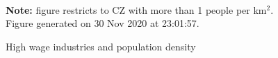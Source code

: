 \begin{figure}[!h]
\centering
\caption{High wage industries and population density}
\label{fig:ind_cities}
  \\ 
\par \begin{minipage}[h]{\textwidth}{\tiny\textbf{Note:} figure restricts to CZ with more than 1 people per km$^2$. Figure generated on 30 Nov 2020 at 23:01:57.}\end{minipage}
\end{figure}
